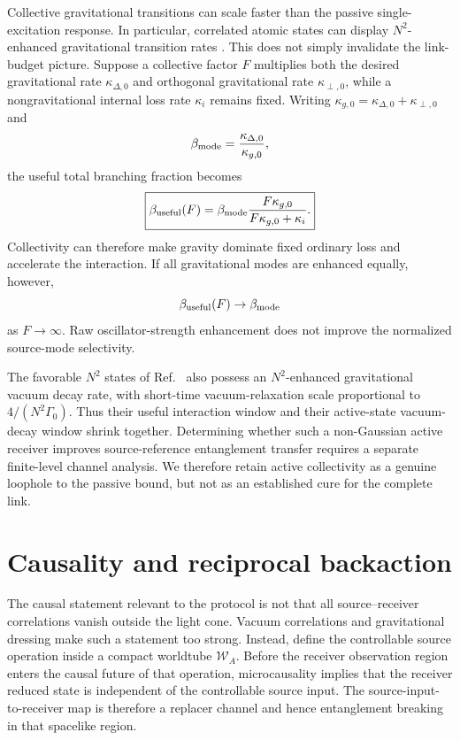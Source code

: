 \documentclass[11pt]{article}
\begin{document}
Collective gravitational transitions can scale faster than the passive single-excitation response. In particular, correlated atomic states can display $N^2$-enhanced gravitational transition rates \cite{QuinonesEtAl2017}. This does not simply invalidate the link-budget picture. Suppose a collective factor $F$ multiplies both the desired gravitational rate $\kappa_{\Delta,0}$ and orthogonal gravitational rate $\kappa_{\perp,0}$, while a nongravitational internal loss rate $\kappa_i$ remains fixed. Writing $\kappa_{g,0}=\kappa_{\Delta,0}+\kappa_{\perp,0}$ and
\begin{equation}
\beta_{\rm mode}=\frac{\kappa_{\Delta,0}}{\kappa_{g,0}},
\end{equation}
the useful total branching fraction becomes
\begin{equation}
\boxed{
\beta_{\rm useful}(F)
=\beta_{\rm mode}
\frac{F\kappa_{g,0}}
{F\kappa_{g,0}+\kappa_i}.
}
\label{eq:collective-beta}
\end{equation}
Collectivity can therefore make gravity dominate fixed ordinary loss and accelerate the interaction. If all gravitational modes are enhanced equally, however,
\begin{equation}
\beta_{\rm useful}(F)\to\beta_{\rm mode}
\end{equation}
as $F\to\infty$. Raw oscillator-strength enhancement does not improve the normalized source-mode selectivity.

The favorable $N^2$ states of Ref.~\cite{QuinonesEtAl2017} also possess an $N^2$-enhanced gravitational vacuum decay rate, with short-time vacuum-relaxation scale proportional to $4/(N^2\Gamma_0)$. Thus their useful interaction window and their active-state vacuum-decay window shrink together. Determining whether such a non-Gaussian active receiver improves source-reference entanglement transfer requires a separate finite-level channel analysis. We therefore retain active collectivity as a genuine loophole to the passive bound, but not as an established cure for the complete link.

\section{Causality and reciprocal backaction}
\label{sec:causality}

The causal statement relevant to the protocol is not that all source--receiver correlations vanish outside the light cone. Vacuum correlations and gravitational dressing make such a statement too strong. Instead, define the controllable source operation inside a compact worldtube $\mathcal W_A$. Before the receiver observation region enters the causal future of that operation, microcausality implies that the receiver reduced state is independent of the controllable source input. The source-input-to-receiver map is therefore a replacer channel and hence entanglement breaking in that spacelike region.
\end{document}
